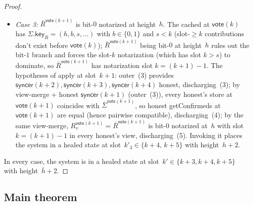 \ifx\litemode\undefined\documentclass{article}\fi
\newcommand{\key}{\mathsf{key}}
\newcommand{\syncer}{\mathsf{syncer}}
\newcommand{\vote}{\mathsf{vote}}
\newcommand{\comm}[1]{\bar{#1}}
\newcommand{\getConfirmed}{\textsf{getConfirmed}\xspace}
\theoremstyle{plain}
\theoremstyle{definition}
\theoremstyle{remark}
\begin{document}
\begin{proof}
\begin{itemize}
  \item \emph{Case 3:} $\comm{R}^{\vote(k+1)}$ is bit-$0$ notarized at height~$h$. The cached at $\vote(k)$ has $\Sigma.\key_R = (h, b, s, \ldots)$ with $b \in \{0, 1\}$ and $s < k$ (slot-$\geq k$ contributions don't exist before $\vote(k)$); $\comm{R}^{\vote(k+1)}$ being bit-$0$ at height~$h$ rules out the bit-$1$ branch and forces the slot-$k$ notarization (which has slot $k > s$) to dominate, so $\comm{R}^{\vote(k+1)}$ has notarization slot $k = (k+1) - 1$. The hypotheses of  apply at slot~$k+1$: outer~(3) provides $\syncer(k+2), \syncer(k+3), \syncer(k+4)$ honest, discharging~(3); by view-merge + honest $\syncer(k+1)$ (outer~(3)), every honest's store at $\vote(k+1)$ coincides with $\comm{\Sigma}^{\vote(k+1)}$, so honest \getConfirmed{}s at $\vote(k+1)$ are equal (hence pairwise compatible), discharging~(4); by the same view-merge, $R_v^{\vote(k+1)} = \comm{R}^{\vote(k+1)}$ is bit-$0$ notarized at~$h$ with slot $k = (k+1)-1$ in every honest's view, discharging~(5). Invoking it places the system in a healed state at slot~$k'_3 \in \{k+4,\, k+5\}$ with height~$h+2$.
\end{itemize}

In every case, the system is in a healed state at slot~$k' \in \{k+3, k+4, k+5\}$ with height~$\comm{h}+2$.
\end{proof}


\subsection{Main theorem}\label{rev:sec:healing-main}
\end{document}
